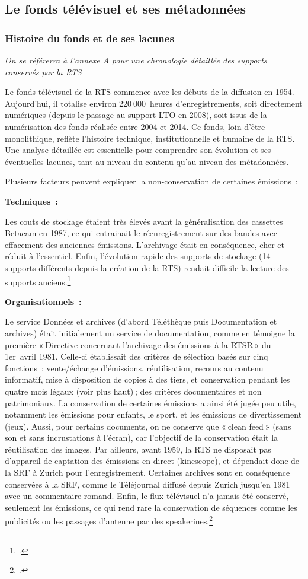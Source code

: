\subsection{Le fonds télévisuel et ses métadonnées}

\subsubsection{Histoire du fonds et de ses lacunes}
\textit{On se référerra à l'annexe A pour une chronologie détaillée des supports conservés par la RTS}

Le fonds télévisuel de la RTS commence avec les débuts de la diffusion en 1954. Aujourd’hui, il totalise environ 220 000 heures d’enregistrements, soit directement numériques (depuis le passage au support LTO en 2008), soit issus de la numérisation des fonds réalisée entre 2004 et 2014. Ce fonds, loin d’être monolithique, reflète l’histoire technique, institutionnelle et humaine de la RTS. Une analyse détaillée est essentielle pour comprendre son évolution et ses éventuelles lacunes, tant au niveau du contenu qu’au niveau des métadonnées.

Plusieurs facteurs peuvent expliquer la non-conservation de certaines émissions :

\textbf{Techniques :}

Les couts de stockage étaient très élevés avant la généralisation des cassettes Betacam en 1987, ce qui entrainait le réenregistrement sur des bandes avec effacement des anciennes émissions. L’archivage était en conséquence, cher et réduit à l’essentiel. Enfin, l’évolution rapide des supports de stockage (14 supports différents depuis la création de la RTS) rendait difficile la lecture des supports anciens.\footcite{barcella2024a}

\textbf{Organisationnels :}

Le service Données et archives (d’abord Téléthèque puis Documentation et archives) était initialement un service de documentation, comme en témoigne la première « Directive concernant l’archivage des émissions à la RTSR » du 1er avril 1981. Celle-ci établissait des critères de sélection basés sur cinq fonctions : vente/échange d’émissions, réutilisation, recours au contenu informatif, mise à disposition de copies à des tiers, et conservation pendant les quatre mois légaux (voir plus haut) ; des critères documentaires et non patrimoniaux. La conservation de certaines émissions a ainsi été jugée peu utile, notamment les émissions pour enfants, le sport, et les émissions de divertissement (jeux). Aussi, pour certains documents, on ne conserve que « clean feed » (sans son et sans incrustations à l’écran), car l’objectif de la conservation était la réutilisation des images.
Par ailleurs, avant 1959, la RTS ne disposait pas d’appareil de captation des émissions en direct (kinescope), et dépendait donc de la SRF à Zurich pour l’enregistrement. Certaines archives sont en conséquence conservées à la SRF, comme le Téléjournal diffusé depuis Zurich jusqu’en 1981 avec un commentaire romand. Enfin, le flux télévisuel n’a jamais été conservé, seulement les émissions, ce qui rend rare la conservation de séquences comme les publicités ou les passages d’antenne par des speakerines.\footcite{barcella2024a}


